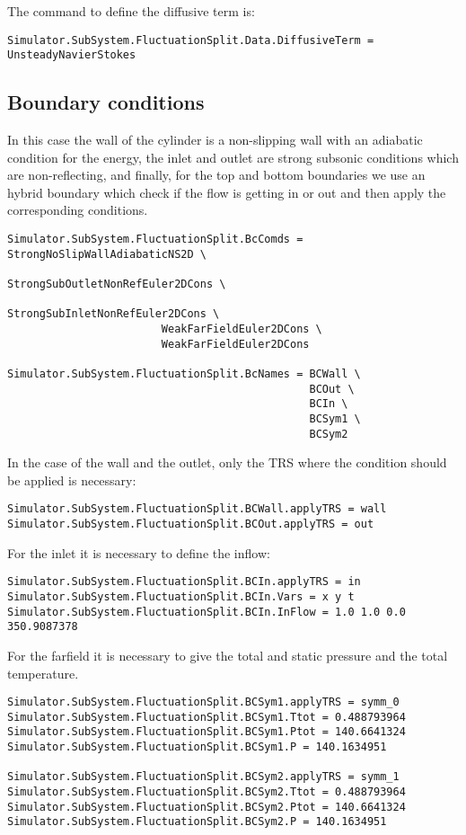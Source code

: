 \documentclass[11pt]{article}
\begin{document}
The command to define the diffusive term is:
\begin{verbatim}
Simulator.SubSystem.FluctuationSplit.Data.DiffusiveTerm = UnsteadyNavierStokes
\end{verbatim}


\subsection{Boundary conditions}
In this case the wall of the cylinder is a non-slipping wall with an adiabatic condition 
for the energy, the inlet and outlet are strong subsonic conditions which are non-reflecting, and finally, for 
the top and bottom boundaries we use an hybrid boundary which check if the flow is getting in or out and
then apply the corresponding conditions.
\begin{verbatim}
Simulator.SubSystem.FluctuationSplit.BcComds = StrongNoSlipWallAdiabaticNS2D \
                                               StrongSubOutletNonRefEuler2DCons \
                                               StrongSubInletNonRefEuler2DCons \
						WeakFarFieldEuler2DCons \
						WeakFarFieldEuler2DCons

Simulator.SubSystem.FluctuationSplit.BcNames = BCWall \
                                               BCOut \
                                               BCIn \
                                               BCSym1 \
                                               BCSym2
\end{verbatim}

In the case of the wall and the outlet, only the TRS where the condition should be applied is
necessary:
\begin{verbatim}
Simulator.SubSystem.FluctuationSplit.BCWall.applyTRS = wall
Simulator.SubSystem.FluctuationSplit.BCOut.applyTRS = out
\end{verbatim}

For the inlet it is necessary to define the inflow:
\begin{verbatim}
Simulator.SubSystem.FluctuationSplit.BCIn.applyTRS = in
Simulator.SubSystem.FluctuationSplit.BCIn.Vars = x y t
Simulator.SubSystem.FluctuationSplit.BCIn.InFlow = 1.0 1.0 0.0 350.9087378
\end{verbatim}


For the farfield it is necessary to give the total and static pressure and the total temperature.
\begin{verbatim}
Simulator.SubSystem.FluctuationSplit.BCSym1.applyTRS = symm_0
Simulator.SubSystem.FluctuationSplit.BCSym1.Ttot = 0.488793964
Simulator.SubSystem.FluctuationSplit.BCSym1.Ptot = 140.6641324
Simulator.SubSystem.FluctuationSplit.BCSym1.P = 140.1634951

Simulator.SubSystem.FluctuationSplit.BCSym2.applyTRS = symm_1
Simulator.SubSystem.FluctuationSplit.BCSym2.Ttot = 0.488793964
Simulator.SubSystem.FluctuationSplit.BCSym2.Ptot = 140.6641324
Simulator.SubSystem.FluctuationSplit.BCSym2.P = 140.1634951
\end{verbatim}
\end{document}
